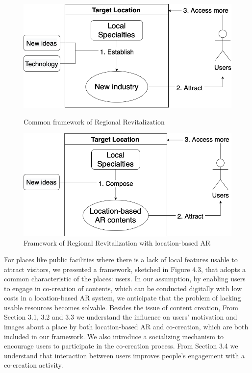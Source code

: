 \begin{figure}
  \begin{minipage}{0.48\textwidth}
    \centering
    \includegraphics[width=0.9\linewidth]{resources/4_methodology/common_vitalization.png}
      \caption{Common framework of Regional Revitalization}
  \end{minipage}\hfill
  \begin{minipage}{0.48\textwidth}
    \centering
    \includegraphics[width=0.9\linewidth]{resources/4_methodology/revitalization_with_AR.png}
      \caption{Framework of Regional Revitalization with location-based AR}
  \end{minipage}
\end{figure}

For places like public facilities where there is a lack of local features usable to attract visitors,
we presented a framework, sketched in Figure 4.3, that adopts a common characteristic of the places: users.
In our assumption, by enabling users to engage in co-creation of contents, which can be conducted digitally with low costs in a location-based AR system,
we anticipate that the problem of lacking usable resources becomes solvable.
Besides the issue of content creation, From Section 3.1, 3.2 and 3.3 we understand the influence on users' motivation and images about a place by both location-based AR and co-creation,
which are both included in our framework.
We also introduce a socializing mechanism to encourage users to participate in the co-creation process.
From Section 3.4 we understand that interaction between users improves people's engagement with a co-creation activity.

